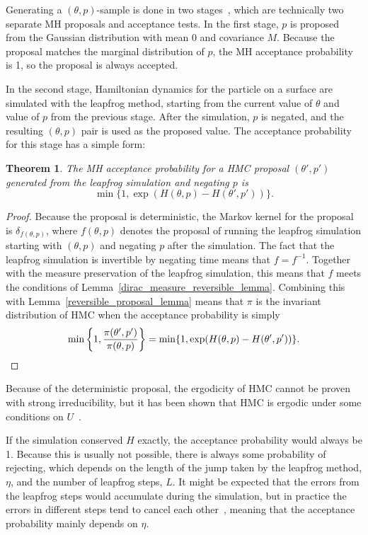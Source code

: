 \documentclass[english,twoside,openright]{HYgraduMLDS}
\newtheorem{theorem}[lemma]{Theorem}
\begin{document}
Generating a \((\theta, p)\)-sample is done in two stages~\cite{neal2012mcmc}, 
which are technically 
two separate MH proposals and acceptance tests. In the first
stage, \(p\) is proposed from the Gaussian distribution with mean 0 and 
covariance \(M\). Because the proposal matches the marginal distribution of 
\(p\), the MH acceptance probability is 1, so the proposal
is always accepted.

In the second stage, Hamiltonian dynamics for the particle on a surface are 
simulated with the leapfrog method, starting from the current value 
of \(\theta\) and value of \(p\) from the previous stage. After the simulation,
\(p\) is negated, and the resulting \((\theta, p)\) pair is used as the
proposed value. The acceptance probability for this stage has a simple
form:
\begin{theorem}
	The MH acceptance probability for a HMC proposal \((\theta', p')\) generated
  from the leapfrog simulation and negating \(p\) is
  \[
    \min\{1, \exp(H(\theta, p) - H(\theta', p'))\}.
  \]
\end{theorem}
\begin{proof}
  Because the proposal is deterministic, the Markov kernel for the
  proposal is \(\delta_{f(\theta, p)}\), where \(f(\theta, p)\) denotes the proposal
  of running the leapfrog simulation starting with \((\theta, p)\) and negating
  \(p\) after the simulation. The fact that the leapfrog simulation is invertible
  by negating time means
  that \(f = f^{-1}\). Together with the measure preservation of the leapfrog
  simulation, this means that \(f\) meets the conditions of
  Lemma~\ref{dirac_measure_reversible_lemma}. Combining this with
  Lemma~\ref{reversible_proposal_lemma} means that \(\pi\) is the invariant
  distribution of HMC when the acceptance probability is simply
  \[
    \min\left\{1, \frac{\pi(\theta', p')}{\pi(\theta, p)}\right\}
    = \min\{1, \exp(H(\theta, p) - H(\theta', p'))\}.
    \qedhere
  \]
\end{proof}

Because of the deterministic proposal, the ergodicity of HMC cannot be
proven with strong irreducibility, but it has been shown that HMC is
ergodic under some conditions on \(U\)~\cite{DMS20}.

If the simulation conserved \(H\) exactly, the acceptance probability would 
always be 1. Because this is usually not possible, there is always some probability 
of rejecting, which depends on the length of the jump taken by the leapfrog 
method, \(\eta\), and the number of leapfrog steps, \(L\). It might be expected 
that the errors from the leapfrog steps would accumulate during the simulation, 
but in practice the errors in different steps tend to cancel each 
other~\cite{neal2012mcmc}, meaning 
that the acceptance probability mainly depends on \(\eta\).
\end{document}

